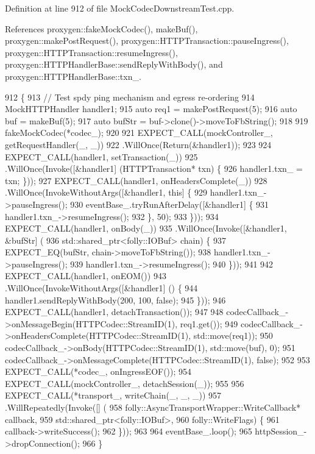 Definition at line 912 of file Mock\+Codec\+Downstream\+Test.\+cpp.



References proxygen\+::fake\+Mock\+Codec(), make\+Buf(), proxygen\+::make\+Post\+Request(), proxygen\+::\+H\+T\+T\+P\+Transaction\+::pause\+Ingress(), proxygen\+::\+H\+T\+T\+P\+Transaction\+::resume\+Ingress(), proxygen\+::\+H\+T\+T\+P\+Handler\+Base\+::send\+Reply\+With\+Body(), and proxygen\+::\+H\+T\+T\+P\+Handler\+Base\+::txn\+\_\+.


\begin{DoxyCode}
912                                               \{
913   \textcolor{comment}{// Test spdy ping mechanism and egress re-ordering}
914   MockHTTPHandler handler1;
915   \textcolor{keyword}{auto} req1 = makePostRequest(5);
916   \textcolor{keyword}{auto} buf = makeBuf(5);
917   \textcolor{keyword}{auto} bufStr = buf->clone()->moveToFbString();
918 
919   fakeMockCodec(*codec\_);
920 
921   EXPECT\_CALL(mockController\_, getRequestHandler(\_, \_))
922     .WillOnce(Return(&handler1));
923 
924   EXPECT\_CALL(handler1, setTransaction(\_))
925     .WillOnce(Invoke([&handler1] (HTTPTransaction* txn) \{
926           handler1.txn_ = txn; \}));
927   EXPECT\_CALL(handler1, onHeadersComplete(\_))
928     .WillOnce(InvokeWithoutArgs([&handler1, \textcolor{keyword}{this}] \{
929           handler1.txn_->pauseIngress();
930           eventBase\_.tryRunAfterDelay([&handler1] \{
931               handler1.txn_->resumeIngress();
932             \}, 50);
933         \}));
934   EXPECT\_CALL(handler1, onBody(\_))
935     .WillOnce(Invoke([&handler1, &bufStr] (
936                        std::shared\_ptr<folly::IOBuf> chain) \{
937           EXPECT\_EQ(bufStr, chain->moveToFbString());
938           handler1.txn_->pauseIngress();
939           handler1.txn_->resumeIngress();
940         \}));
941 
942   EXPECT\_CALL(handler1, onEOM())
943     .WillOnce(InvokeWithoutArgs([&handler1] () \{
944           handler1.sendReplyWithBody(200, 100, \textcolor{keyword}{false});
945         \}));
946   EXPECT\_CALL(handler1, detachTransaction());
947 
948   codecCallback\_->onMessageBegin(HTTPCodec::StreamID(1), req1.get());
949   codecCallback\_->onHeadersComplete(HTTPCodec::StreamID(1), std::move(req1));
950   codecCallback\_->onBody(HTTPCodec::StreamID(1), std::move(buf), 0);
951   codecCallback\_->onMessageComplete(HTTPCodec::StreamID(1), \textcolor{keyword}{false});
952 
953   EXPECT\_CALL(*codec\_, onIngressEOF());
954   EXPECT\_CALL(mockController\_, detachSession(\_));
955 
956   EXPECT\_CALL(*transport\_, writeChain(\_, \_, \_))
957     .WillRepeatedly(Invoke([] (
958             folly::AsyncTransportWrapper::WriteCallback* callback,
959             std::shared\_ptr<folly::IOBuf>,
960             folly::WriteFlags) \{
961           callback->writeSuccess();
962           \}));
963 
964   eventBase\_.loop();
965   httpSession\_->dropConnection();
966 \}
\end{DoxyCode}

